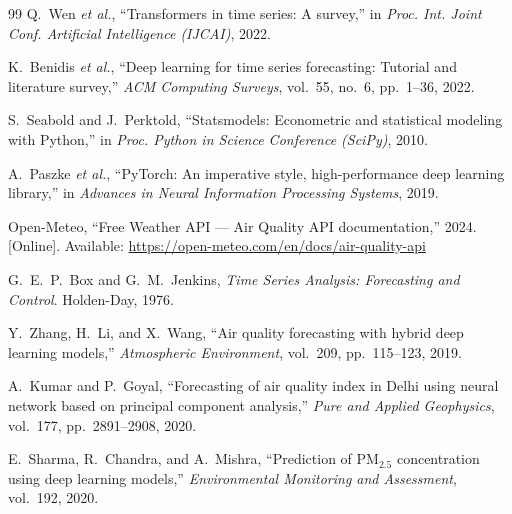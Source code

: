 \documentclass[conference]{IEEEtran}
\begin{document}
\begin{thebibliography}{99}
Q.~Wen \textit{et al.}, ``Transformers in time series: A survey,'' in \textit{Proc. Int. Joint Conf. Artificial Intelligence (IJCAI)}, 2022.

K.~Benidis \textit{et al.}, ``Deep learning for time series forecasting: Tutorial and literature survey,'' \textit{ACM Computing Surveys}, vol.~55, no.~6, pp.~1--36, 2022.

S.~Seabold and J.~Perktold, ``Statsmodels: Econometric and statistical modeling with Python,'' in \textit{Proc. Python in Science Conference (SciPy)}, 2010.

A.~Paszke \textit{et al.}, ``PyTorch: An imperative style, high-performance deep learning library,'' in \textit{Advances in Neural Information Processing Systems}, 2019.

Open-Meteo, ``Free Weather API --- Air Quality API documentation,'' 2024. [Online]. Available: \url{https://open-meteo.com/en/docs/air-quality-api}

G.~E.~P.~Box and G.~M.~Jenkins, \textit{Time Series Analysis: Forecasting and Control}. Holden-Day, 1976.

Y.~Zhang, H.~Li, and X.~Wang, ``Air quality forecasting with hybrid deep learning models,'' \textit{Atmospheric Environment}, vol.~209, pp.~115--123, 2019.

A.~Kumar and P.~Goyal, ``Forecasting of air quality index in Delhi using neural network based on principal component analysis,'' \textit{Pure and Applied Geophysics}, vol.~177, pp.~2891--2908, 2020.

E.~Sharma, R.~Chandra, and A.~Mishra, ``Prediction of PM$_{2.5}$ concentration using deep learning models,'' \textit{Environmental Monitoring and Assessment}, vol.~192, 2020.

\end{thebibliography}
\end{document}
